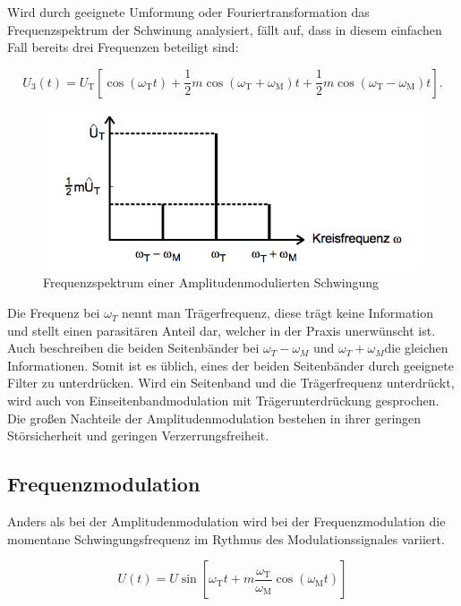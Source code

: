 Wird durch geeignete Umformung oder Fouriertransformation das Frequenzspektrum der Schwinung analysiert, fällt auf, dass in diesem einfachen Fall bereits drei Frequenzen beteiligt sind:

\begin{equation}
U_{3}(t) = U_\text{T} \left[ \cos( \omega_\text{T} t) + \frac{1}{2} m \cos(\omega_\text{T} + \omega_\text{M}) t + \frac{1}{2} m \cos(\omega_\text{T} - \omega_\text{M}) t \right].
\label{eq:FreqAmMod}
\end{equation}

\begin{figure}
	\centering
	\includegraphics[width=\textwidth]{img/Abb2.png}
	\caption{Frequenzspektrum einer Amplitudenmodulierten Schwingung \cite{FP}}
\end{figure}

\noindent Die Frequenz bei $\omega_T$ nennt man Trägerfrequenz, diese trägt keine Information und stellt einen parasitären Anteil dar, welcher in der Praxis unerwünscht ist. Auch beschreiben die beiden Seitenbänder bei $\omega_T - \omega_M$ und $\omega_T + \omega_M$die gleichen Informationen. Somit ist es üblich, eines der beiden Seitenbänder durch geeignete Filter zu unterdrücken.
Wird ein Seitenband und die Trägerfrequenz unterdrückt, wird auch von Einseitenbandmodulation mit Trägerunterdrückung gesprochen.
Die großen Nachteile der Amplitudenmodulation bestehen in ihrer geringen Störsicherheit und geringen Verzerrungsfreiheit.

\subsection{Frequenzmodulation}
Anders als bei der Amplitudenmodulation wird bei der Frequenzmodulation die momentane Schwingungsfrequenz im Rythmus des Modulationssignales variiert.

\begin{equation}
U(t)= U \sin \left[\omega_\text{T} t + m \frac{\omega_\text{T}}{\omega_\text{M}} \cos(\omega_\text{M} t)\right]
\label{eq:FreqMod}
\end{equation}


